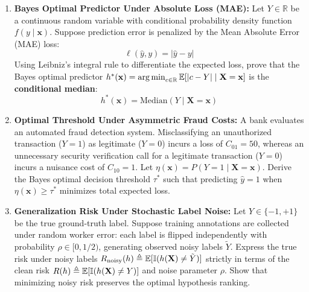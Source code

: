 \begin{enumerate}[label=\textbf{P\arabic*.}]
    \item \textbf{Bayes Optimal Predictor Under Absolute Loss (MAE):}
    Let $Y \in \mathbb{R}$ be a continuous random variable with conditional probability density function $f(y \mid \mathbf{x})$. Suppose prediction error is penalized by the Mean Absolute Error (MAE) loss:
    \begin{equation*}
    \ell(\hat{y}, y) = |\hat{y} - y|
    \end{equation*}
    Using Leibniz's integral rule to differentiate the expected loss, prove that the Bayes optimal predictor $h^*(\mathbf{x}) = \operatorname*{arg\,min}_{c \in \mathbb{R}} \operatorname{\mathbb{E}}[|c - Y| \mid \mathbf{X} = \mathbf{x}]$ is the \textbf{conditional median}:
    \begin{equation*}
    h^*(\mathbf{x}) = \text{Median}(Y \mid \mathbf{X} = \mathbf{x})
    \end{equation*}

    \item \textbf{Optimal Threshold Under Asymmetric Fraud Costs:}
    A bank evaluates an automated fraud detection system. Misclassifying an unauthorized transaction ($Y = 1$) as legitimate ($Y = 0$) incurs a loss of $C_{01} = 50$, whereas an unnecessary security verification call for a legitimate transaction ($Y = 0$) incurs a nuisance cost of $C_{10} = 1$. Let $\eta(\mathbf{x}) = P(Y = 1 \mid \mathbf{X} = \mathbf{x})$. Derive the Bayes optimal decision threshold $\tau^*$ such that predicting $\hat{y} = 1$ when $\eta(\mathbf{x}) \ge \tau^*$ minimizes total expected loss.

    \item \textbf{Generalization Risk Under Stochastic Label Noise:}
    Let $Y \in \{-1, +1\}$ be the true ground-truth label. Suppose training annotations are collected under random worker error: each label is flipped independently with probability $\rho \in [0, 1/2)$, generating observed noisy labels $\tilde{Y}$. Express the true risk under noisy labels $R_{\text{noisy}}(h) \triangleq \operatorname{\mathbb{E}}[\mathbb{I}(h(\mathbf{X}) \ne \tilde{Y})]$ strictly in terms of the clean risk $R(h) \triangleq \operatorname{\mathbb{E}}[\mathbb{I}(h(\mathbf{X}) \ne Y)]$ and noise parameter $\rho$. Show that minimizing noisy risk preserves the optimal hypothesis ranking.


\end{enumerate}
